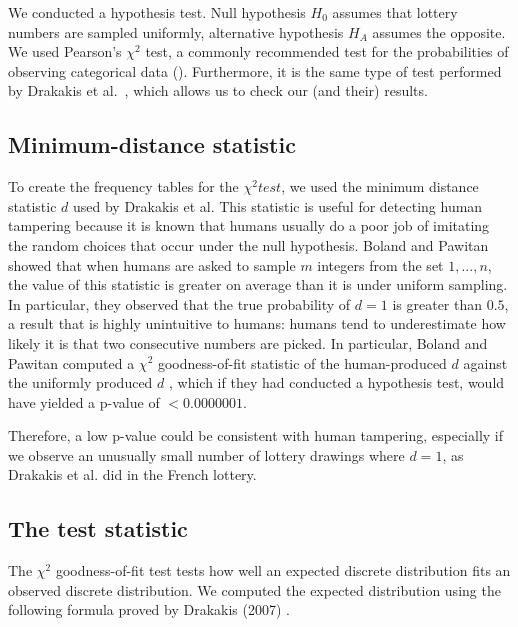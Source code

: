 We conducted a hypothesis test. Null hypothesis $H_0$ assumes that lottery numbers are sampled uniformly,
alternative hypothesis $H_A$ assumes the opposite. We used Pearson's $\chi^2$ test, a commonly recommended
test for the probabilities of observing categorical data (). Furthermore, it is the same type
of test performed by Drakakis et al.~\cite{Drakakis}, which allows us to check our (and their) results.

\subsection{Minimum-distance statistic}

To create the frequency tables for the $\chi^2 test$, we used the minimum distance statistic $d$ used by Drakakis et al.
This statistic is useful for detecting human tampering because it is known that humans usually do a
poor job of imitating the random choices that occur under the null hypothesis. Boland and Pawitan  showed
that when humans are asked to sample $m$ integers from the set ${1,...,n}$, the value
of this statistic is greater on average than it is under uniform sampling. In particular,
they observed that the true probability of $d = 1$ is greater than $0.5$, a result that 
is highly unintuitive to humans: humans tend to underestimate how likely it is that
two consecutive numbers are picked. In particular, Boland and Pawitan
computed a $\chi^2$ goodness-of-fit statistic of the human-produced $d$ against the uniformly produced $d$
, which if they had conducted a hypothesis test, would have yielded a 
p-value of $< 0.0000001$. 

Therefore, a low p-value could be consistent with human tampering, especially if we
observe an unusually small number of lottery drawings where $d = 1$, as Drakakis et al.
did in the French lottery. 

\subsection{The test statistic}

The $\chi^2$ goodness-of-fit test tests how well an expected discrete distribution fits
an observed discrete distribution. We computed the expected distribution using the following formula proved by Drakakis (2007) .

